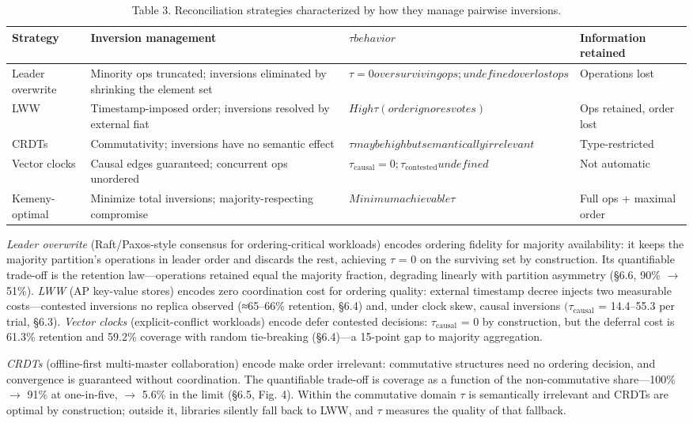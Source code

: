 \documentclass[10pt,twocolumn]{article}
\begin{document}
\begin{table}[t]
\centering
\caption{Table 3. Reconciliation strategies characterized by how they manage pairwise inversions.}
\begin{tabular}{llll}
\hline
Strategy & Inversion management & $\tau behavior$ & Information retained \\
\hline
Leader overwrite & Minority ops truncated; inversions eliminated by shrinking the element set & $\tau = 0 over surviving ops; undefined over lost ops$ & Operations lost \\
LWW & Timestamp-imposed order; inversions resolved by external fiat & $High \tau (order ignores votes)$ & Ops retained, order lost \\
CRDTs & Commutativity; inversions have no semantic effect & $\tau may be high but semantically irrelevant$ & Type-restricted \\
Vector clocks & Causal edges guaranteed; concurrent ops unordered & $\tau_{\mathrm{causal}} = 0; \tau_{\mathrm{contested}} undefined$ & Not automatic \\
Kemeny-optimal & Minimize total inversions; majority-respecting compromise & $Minimum achievable \tau$ & Full ops + maximal order \\
\hline
\end{tabular}
\end{table}

\emph{Leader overwrite} (Raft/Paxos-style consensus for ordering-critical workloads) encodes ordering fidelity for majority availability: it keeps the majority partition's operations in leader order and discards the rest, achieving $\tau$ = 0 on the surviving set by construction. Its quantifiable trade-off is the retention law—operations retained equal the majority fraction, degrading linearly with partition asymmetry (§6.6, 90\% $\rightarrow$ 51\%). \emph{LWW} (AP key-value stores) encodes zero coordination cost for ordering quality: external timestamp decree injects two measurable costs—contested inversions no replica observed (≈65–66\% retention, §6.4) and, under clock skew, causal inversions $(\tau_{\mathrm{causal}}$ = 14.4–55.3 per trial, §6.3). \emph{Vector clocks} (explicit-conflict workloads) encode defer contested decisions: $\tau_{\mathrm{causal}}$ = 0 by construction, but the deferral cost is 61.3\% retention and 59.2\% coverage with random tie-breaking (§6.4)—a 15-point gap to majority aggregation.

\emph{CRDTs} (offline-first multi-master collaboration) encode make order irrelevant: commutative structures need no ordering decision, and convergence is guaranteed without coordination. The quantifiable trade-off is coverage as a function of the non-commutative share—100\% $\rightarrow$ 91\% at one-in-five, $\rightarrow$ 5.6\% in the limit (§6.5, Fig. 4). Within the commutative domain $\tau$ is semantically irrelevant and CRDTs are optimal by construction; outside it, libraries silently fall back to LWW, and $\tau$ measures the quality of that fallback.
\end{document}

